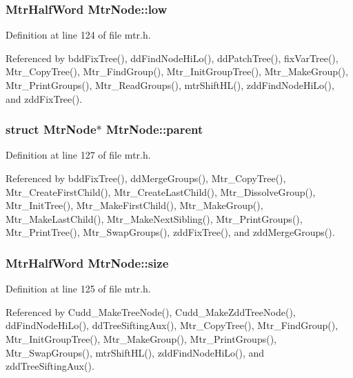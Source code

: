 \subsubsection{\setlength{\rightskip}{0pt plus 5cm}\bf{Mtr\-Half\-Word} \bf{Mtr\-Node::low}}\label{structMtrNode_589c940a5262c8da11bf843a369bb2db}




Definition at line 124 of file mtr.h.

Referenced by bdd\-Fix\-Tree(), dd\-Find\-Node\-Hi\-Lo(), dd\-Patch\-Tree(), fix\-Var\-Tree(), Mtr\_\-Copy\-Tree(), Mtr\_\-Find\-Group(), Mtr\_\-Init\-Group\-Tree(), Mtr\_\-Make\-Group(), Mtr\_\-Print\-Groups(), Mtr\_\-Read\-Groups(), mtr\-Shift\-HL(), zdd\-Find\-Node\-Hi\-Lo(), and zdd\-Fix\-Tree().
\subsubsection{\setlength{\rightskip}{0pt plus 5cm}struct \bf{Mtr\-Node}$\ast$ \bf{Mtr\-Node::parent}}\label{structMtrNode_8f2e33e51ef2ff7cca04055245d388ef}




Definition at line 127 of file mtr.h.

Referenced by bdd\-Fix\-Tree(), dd\-Merge\-Groups(), Mtr\_\-Copy\-Tree(), Mtr\_\-Create\-First\-Child(), Mtr\_\-Create\-Last\-Child(), Mtr\_\-Dissolve\-Group(), Mtr\_\-Init\-Tree(), Mtr\_\-Make\-First\-Child(), Mtr\_\-Make\-Group(), Mtr\_\-Make\-Last\-Child(), Mtr\_\-Make\-Next\-Sibling(), Mtr\_\-Print\-Groups(), Mtr\_\-Print\-Tree(), Mtr\_\-Swap\-Groups(), zdd\-Fix\-Tree(), and zdd\-Merge\-Groups().
\subsubsection{\setlength{\rightskip}{0pt plus 5cm}\bf{Mtr\-Half\-Word} \bf{Mtr\-Node::size}}\label{structMtrNode_d1d0b76802143ff49d63c0a61b26dc62}




Definition at line 125 of file mtr.h.

Referenced by Cudd\_\-Make\-Tree\-Node(), Cudd\_\-Make\-Zdd\-Tree\-Node(), dd\-Find\-Node\-Hi\-Lo(), dd\-Tree\-Sifting\-Aux(), Mtr\_\-Copy\-Tree(), Mtr\_\-Find\-Group(), Mtr\_\-Init\-Group\-Tree(), Mtr\_\-Make\-Group(), Mtr\_\-Print\-Groups(), Mtr\_\-Swap\-Groups(), mtr\-Shift\-HL(), zdd\-Find\-Node\-Hi\-Lo(), and zdd\-Tree\-Sifting\-Aux().
